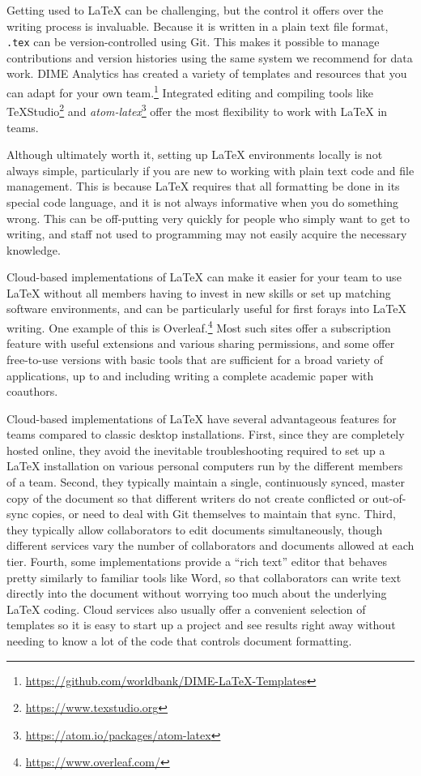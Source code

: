 \documentclass[
]{book}
\begin{document}
Getting used to LaTeX can be challenging,
but the control it offers over the writing process is invaluable.
Because it is written in a plain text file format,
\texttt{.tex} can be version-controlled using Git.
This makes it possible to manage contributions and version histories
using the same system we recommend for data work.
DIME Analytics has created a variety of templates and resources
that you can adapt for your own team.\footnote{\url{https://github.com/worldbank/DIME-LaTeX-Templates}}
Integrated editing and compiling tools like TeXStudio\footnote{\url{https://www.texstudio.org}}
and \emph{atom-latex}\footnote{\url{https://atom.io/packages/atom-latex}}
offer the most flexibility to work with LaTeX in teams.

Although ultimately worth it, setting up LaTeX environments locally is not always simple,
particularly if you are new to working with plain text code and file management.
This is because LaTeX requires that all formatting be done in its special code language,
and it is not always informative when you do something wrong.
This can be off-putting very quickly for people
who simply want to get to writing,
and staff not used to programming may not easily acquire the necessary knowledge.

Cloud-based implementations of LaTeX can make it easier for your team to use
LaTeX without all members having to invest in new skills
or set up matching software environments,
and can be particularly useful for first forays into LaTeX writing.
One example of this is Overleaf.\footnote{\url{https://www.overleaf.com/}}
Most such sites offer a subscription feature
with useful extensions and various sharing permissions,
and some offer free-to-use versions with basic tools that are sufficient
for a broad variety of applications,
up to and including writing a complete academic paper with coauthors.

Cloud-based implementations of LaTeX have several advantageous features
for teams compared to classic desktop installations.
First, since they are completely hosted online,
they avoid the inevitable troubleshooting required to set up a LaTeX installation
on various personal computers run by the different members of a team.
Second, they typically maintain a single, continuously synced, master copy of the document
so that different writers do not create conflicted or out-of-sync copies,
or need to deal with Git themselves to maintain that sync.
Third, they typically allow collaborators to edit documents simultaneously,
though different services vary the number of collaborators and documents allowed at each tier.
Fourth, some implementations provide a ``rich text'' editor
that behaves pretty similarly to familiar tools like Word,
so that collaborators can write text directly into the document without worrying too much
about the underlying LaTeX coding.
Cloud services also usually offer a convenient selection of templates
so it is easy to start up a project and see results right away
without needing to know a lot of the code that controls document formatting.
\end{document}
